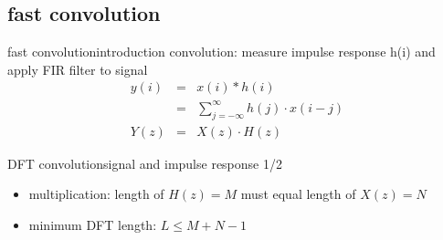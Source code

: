 \subsection{fast convolution}

\begin{frame}{fast convolution}{introduction}
	convolution: measure impulse response h(i) and apply FIR filter to signal
	\begin{eqnarray}
		y(i) &=& x(i) \ast h(i)\\
			 &=& \sum\limits_{j=-\infty}^{\infty}{h(j)\cdot x(i-j)}\\
		Y(z) &=& X(z) \cdot H(z)
	\end{eqnarray}
\end{frame}

\begin{frame}{DFT convolution}{signal and impulse response 1/2}
	\begin{itemize}
		\item	multiplication: length of $H(z) = M$ must equal length of $X(z) = N$
		\item	minimum DFT length: $L \leq M+N-1$
	\end{itemize}
	\vspace{50mm}
\end{frame}

